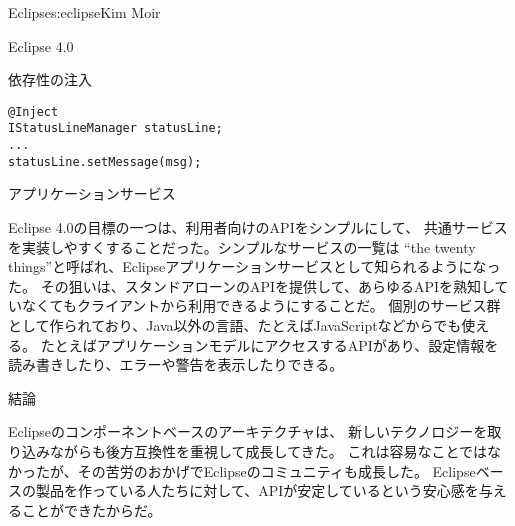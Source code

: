\begin{aosachapter}{Eclipse}{s:eclipse}{Kim Moir}
\begin{aosasect1}{Eclipse 4.0}
\begin{aosasect2}{依存性の注入}
\begin{verbatim}
@Inject
IStatusLineManager statusLine;
...
statusLine.setMessage(msg);
\end{verbatim}

\end{aosasect2}

\begin{aosasect2}{アプリケーションサービス}

Eclipse 4.0の目標の一つは、利用者向けのAPIをシンプルにして、
共通サービスを実装しやすくすることだった。シンプルなサービスの一覧は
``the twenty things''と呼ばれ、Eclipseアプリケーションサービスとして知られるようになった。
その狙いは、スタンドアローンのAPIを提供して、あらゆるAPIを熟知していなくてもクライアントから利用できるようにすることだ。
個別のサービス群として作られており、Java以外の言語、たとえばJavaScriptなどからでも使える。
たとえばアプリケーションモデルにアクセスするAPIがあり、設定情報を読み書きしたり、エラーや警告を表示したりできる。

\end{aosasect2}

\end{aosasect1}

\begin{aosasect1}{結論}

Eclipseのコンポーネントベースのアーキテクチャは、
新しいテクノロジーを取り込みながらも後方互換性を重視して成長してきた。
これは容易なことではなかったが、その苦労のおかげでEclipseのコミュニティも成長した。
Eclipseベースの製品を作っている人たちに対して、APIが安定しているという安心感を与えることができたからだ。


\end{aosasect1}
\end{aosachapter}

